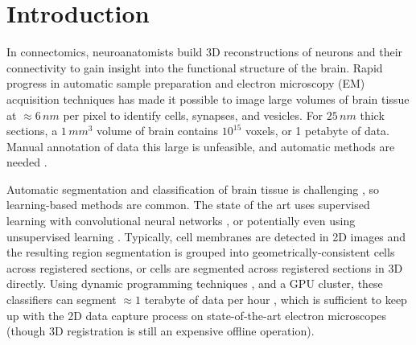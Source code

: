 \section{Introduction}



In connectomics, neuroanatomists build 3D reconstructions of neurons and their connectivity to gain insight into the functional structure of the brain. Rapid progress in automatic sample preparation and electron microscopy (EM) acquisition techniques has made it possible to image large volumes of brain tissue at $\approx6\, nm$ per pixel to identify cells, synapses, and vesicles. For $25\, nm$ thick sections, a $1\, mm^3$ volume of brain contains $10^{15}$ voxels, or 1 petabyte of data. Manual annotation of data this large is unfeasible, and automatic methods are needed \cite{jain2010,Liu2014,GALA2014,kaynig2015large}.

Automatic segmentation and classification of brain tissue is challenging \cite{isbi_challenge}, so learning-based methods are common. The state of the art uses supervised learning with convolutional neural networks \cite{Ciresan:2012f}, or potentially even using unsupervised learning \cite{BogovicHJ13}. Typically, cell membranes are detected in 2D images and the resulting region segmentation is grouped into geometrically-consistent cells across registered sections, or cells are segmented across registered sections in 3D directly. Using dynamic programming techniques \cite{Masci:2013a}, and a GPU cluster, these classifiers can segment  $\approx1$ terabyte of data per hour \cite{kasthuri2015saturated}, which is sufficient to keep up with the 2D data capture process on state-of-the-art electron microscopes (though 3D registration is still an expensive offline operation).


